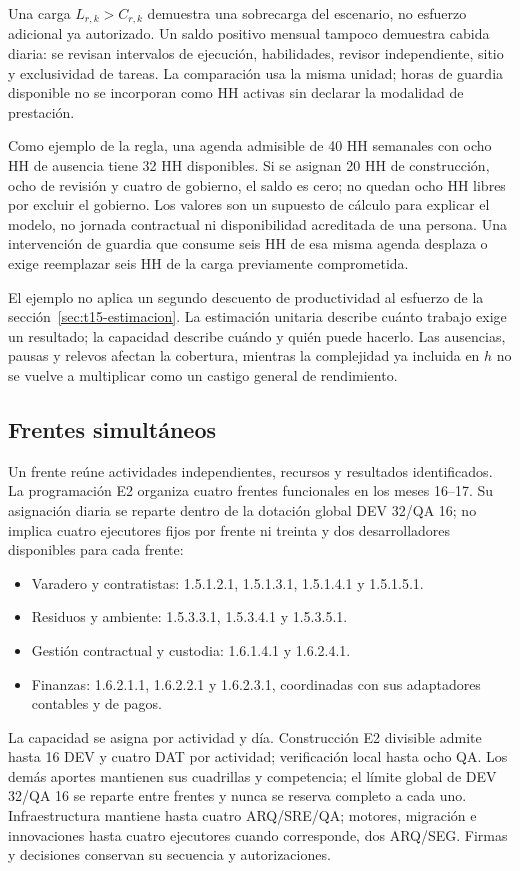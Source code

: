 Una carga $L_{r,k}>C_{r,k}$ demuestra una sobrecarga del escenario, no esfuerzo adicional ya autorizado. Un saldo positivo mensual tampoco demuestra cabida diaria: se revisan intervalos de ejecución, habilidades, revisor independiente, sitio y exclusividad de tareas. La comparación usa la misma unidad; horas de guardia disponible no se incorporan como HH activas sin declarar la modalidad de prestación.

Como ejemplo de la regla, una agenda admisible de 40 HH semanales con ocho HH de ausencia tiene 32 HH disponibles. Si se asignan 20 HH de construcción, ocho de revisión y cuatro de gobierno, el saldo es cero; no quedan ocho HH libres por excluir el gobierno. Los valores son un supuesto de cálculo para explicar el modelo, no jornada contractual ni disponibilidad acreditada de una persona. Una intervención de guardia que consume seis HH de esa misma agenda desplaza o exige reemplazar seis HH de la carga previamente comprometida.

El ejemplo no aplica un segundo descuento de productividad al esfuerzo de la sección~\ref{sec:t15-estimacion}. La estimación unitaria describe cuánto trabajo exige un resultado; la capacidad describe cuándo y quién puede hacerlo. Las ausencias, pausas y relevos afectan la cobertura, mientras la complejidad ya incluida en $h$ no se vuelve a multiplicar como un castigo general de rendimiento.

\subsection{Frentes simultáneos}

Un frente reúne actividades independientes, recursos y resultados identificados. La programación E2 organiza cuatro frentes funcionales en los meses 16--17. Su asignación diaria se reparte dentro de la dotación global DEV 32/QA 16; no implica cuatro ejecutores fijos por frente ni treinta y dos desarrolladores disponibles para cada frente:
\begin{itemize}
\item Varadero y contratistas: 1.5.1.2.1, 1.5.1.3.1, 1.5.1.4.1 y 1.5.1.5.1.
\item Residuos y ambiente: 1.5.3.3.1, 1.5.3.4.1 y 1.5.3.5.1.
\item Gestión contractual y custodia: 1.6.1.4.1 y 1.6.2.4.1.
\item Finanzas: 1.6.2.1.1, 1.6.2.2.1 y 1.6.2.3.1, coordinadas con sus adaptadores contables y de pagos.
\end{itemize}
La capacidad se asigna por actividad y día. Construcción E2 divisible admite hasta 16 DEV y cuatro DAT por actividad; verificación local hasta ocho QA. Los demás aportes mantienen sus cuadrillas y competencia; el límite global de DEV 32/QA 16 se reparte entre frentes y nunca se reserva completo a cada uno. Infraestructura mantiene hasta cuatro ARQ/SRE/QA; motores, migración e innovaciones hasta cuatro ejecutores cuando corresponde, dos ARQ/SEG. Firmas y decisiones conservan su secuencia y autorizaciones.

